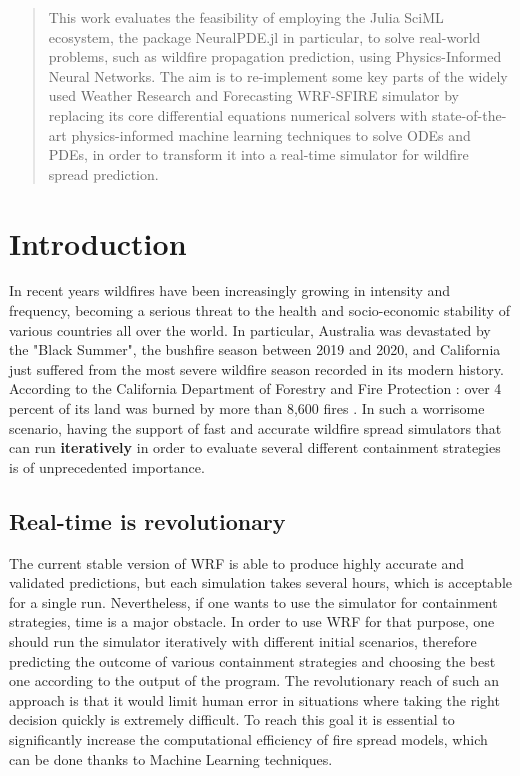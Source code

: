 \documentclass{juliacon}
\begin{document}


\maketitle

\begin{abstract}
This work evaluates the feasibility of employing the Julia SciML ecosystem, the package NeuralPDE.jl in particular, to solve real-world problems, such as wildfire propagation prediction, using Physics-Informed Neural Networks. The aim is to re-implement some key parts of the widely used Weather Research and Forecasting WRF-SFIRE simulator by replacing its core differential equations numerical solvers with state-of-the-art physics-informed machine learning techniques to solve ODEs and PDEs, in order to transform it into a real-time simulator for wildfire spread prediction.
\end{abstract}

\section{Introduction}
In recent years wildfires have been increasingly growing in intensity and frequency, becoming a serious threat to the health and socio-economic stability of various countries all over the world. In particular, Australia was devastated by the "Black Summer", the bushfire season between 2019 and 2020, and California just suffered from the most severe wildfire season recorded in its modern history. According to the California Department of Forestry and Fire Protection \cite{Gauk}: over 4 percent of its land was burned by more than 8,600 fires \cite{CALFIRE}.
In such a worrisome scenario, having the support of fast and accurate wildfire spread simulators that can run \textbf{iteratively} in order to evaluate several different containment strategies is of unprecedented importance.

\subsection{Real-time is revolutionary}
The current stable version of WRF is able to produce highly accurate and validated predictions, but each simulation takes several hours, which is acceptable for a single run. Nevertheless, if one wants to use the simulator for containment strategies, time is a major obstacle. In order to use WRF for that purpose, one should run the simulator iteratively with different initial scenarios, therefore predicting the outcome of various containment strategies and choosing the best one according to the output of the program. The revolutionary reach of such an approach is that it would limit human error in situations where taking the right decision quickly is extremely difficult. To reach this goal it is essential to significantly increase the computational efficiency of fire spread models, which can be done thanks to Machine Learning techniques.
\end{document}
